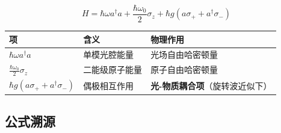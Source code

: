 \documentclass[
  11pt,
  a4paper,
]{ctexrep}
\newcounter{none} %
\begin{document}
\[
H = \hbar\omega a^\dagger a + \frac{\hbar\omega_0}{2}\sigma_z + \hbar g (a\sigma_+ + a^\dagger\sigma_-)
\]

{\def\LTcaptype{none} %
\begin{longtable}[]{@{}
  >{\raggedright\arraybackslash}p{}
  >{\raggedright\arraybackslash}p{}
  >{\raggedright\arraybackslash}p{}@{}}
\toprule\noalign{}
\begin{minipage}[b]{\linewidth}\raggedright
项
\end{minipage} & \begin{minipage}[b]{\linewidth}\raggedright
含义
\end{minipage} & \begin{minipage}[b]{\linewidth}\raggedright
物理作用
\end{minipage} \\
\midrule\noalign{}
\endhead
\bottomrule\noalign{}
\endlastfoot
\(\hbar\omega a^\dagger a\) & 单模光腔能量 & 光场自由哈密顿量 \\
\(\frac{\hbar\omega_0}{2}\sigma_z\) & 二能级原子能量 &
原子自由哈密顿量 \\
\(\hbar g (a\sigma_+ + a^\dagger\sigma_-)\) & 偶极相互作用 &
\textbf{光-物质耦合项}（旋转波近似下） \\
\end{longtable}
}

\subsection{公式溯源}\label{ux516cux5f0fux6eafux6e90-1}
\end{document}
